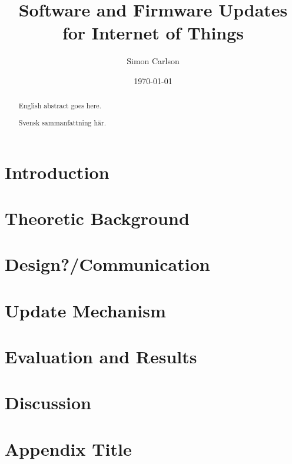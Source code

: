 \documentclass{kththesis}
\title{Software and Firmware Updates for Internet of Things}
\author{Simon Carlson}
\date{\today}
\begin{document}
\frontmatter

\titlepage

\begin{abstract}
  English abstract goes here.

  
\end{abstract}


\begin{otherlanguage}{swedish}
  \begin{abstract}
    Svensk sammanfattning här.
  \end{abstract}
\end{otherlanguage}


\tableofcontents


\mainmatter


\chapter{Introduction}



\chapter{Theoretic Background}


\chapter{Design?/Communication}

\chapter{Update Mechanism}

\chapter{Evaluation and Results}

\chapter{Discussion}


\printbibliography[heading=bibintoc] %

\appendix

\chapter{Appendix Title}
\end{document}
